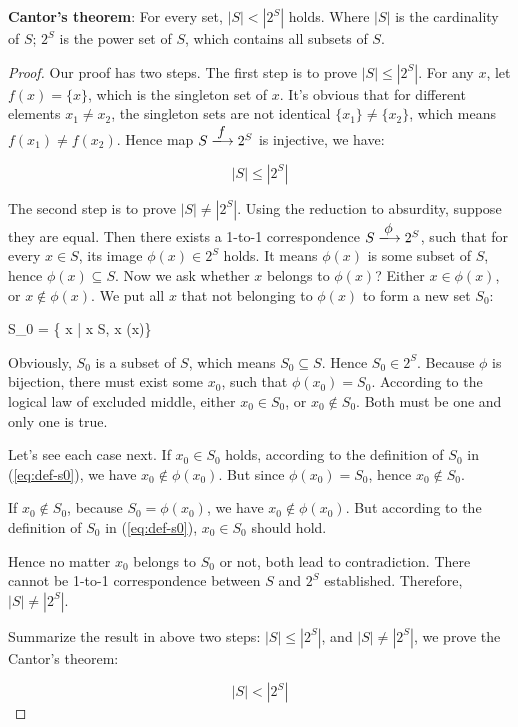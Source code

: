 \documentclass{article}
\begin{document}
\begin{theorem}
\textbf{Cantor's theorem}: For every set, $|S| < |2^S|$ holds. Where $|S|$ is the cardinality of $S$; $2^S$ is the power set of $S$, which contains all subsets of $S$.
\end{theorem}

\begin{proof}
Our proof has two steps. The first step is to prove $|S| \leq |2^S|$. For any $x$, let $f(x) = \{x\}$, which is the singleton set of $x$. It's obvious that for different elements $x_1 \neq x_2$, the singleton sets are not identical $\{x_1\} \neq \{x_2\}$, which means $f(x_1) \neq f(x_2)$. Hence map $S \arrowto{f} 2^S$ is injective, we have:

\[
  |S| \leq |2^S|
\]

The second step is to prove $|S| \neq |2^S|$. Using the reduction to absurdity, suppose they are equal. Then there exists a 1-to-1 correspondence $S \arrowto{\phi} 2^S$, such that for every $x \in S$, its image $\phi(x) \in 2^S$ holds. It means $\phi(x)$ is some subset of $S$, hence $\phi(x) \subseteq S$. Now we ask whether $x$ belongs to $\phi(x)$? Either $x \in \phi(x)$, or $x \notin \phi(x)$. We put all $x$ that not belonging to $\phi(x)$ to form a new set $S_0$:

\be
S_0 = \{ x | x \in S,  x \notin \phi(x)\}
\label{eq:def-s0}
\ee

Obviously, $S_0$ is a subset of $S$, which means $S_0 \subseteq S$. Hence $S_0 \in 2^S$. Because $\phi$ is bijection, there must exist some $x_0$, such that $\phi(x_0) = S_0$. According to the logical law of excluded middle, either $x_0 \in S_0$, or $x_0 \notin S_0$. Both must be one and only one is true.

Let's see each case next. If $x_0 \in S_0$ holds, according to the definition of $S_0$ in (\ref{eq:def-s0}), we have $x_0 \notin \phi(x_0)$. But since $\phi(x_0) = S_0$, hence $x_0 \notin S_0$.

If $x_0 \notin S_0$, because $S_0 = \phi(x_0)$, we have $x_0 \notin \phi(x_0)$. But according to the definition of $S_0$ in (\ref{eq:def-s0}), $x_0 \in S_0$ should hold.

Hence no matter $x_0$ belongs to $S_0$ or not, both lead to contradiction. There cannot be 1-to-1 correspondence between $S$ and $2^S$ established. Therefore, $|S| \neq |2^S|$.

Summarize the result in above two steps: $|S| \leq |2^S|$, and $|S| \neq |2^S|$, we prove the Cantor's theorem:

\[
  |S| < |2^S|
\]
\end{proof}
\end{document}
